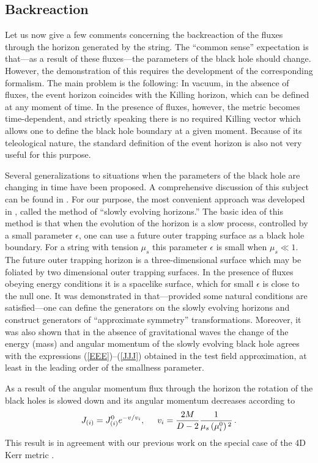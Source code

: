 \documentclass[superscriptaddress,twocolumn,showpacs,
preprintnumbers,amsmath,amssymb,nofootinbib,
longbibliography,aps,prd,10pt]{revtex4-1}
\newcommand{\hh}{,\hspace{0.5cm}}
\newcommand{\be}{\begin{equation}}             %
\newcommand{\ee}{\end{equation}}               %
\begin{document}
\subsection{Backreaction}
Let us now give a few comments concerning the backreaction of the fluxes through the horizon generated by the string. The ``common sense'' expectation is that---as a result of these fluxes---the parameters of the black hole should change. However, the demonstration of this requires the development of the corresponding formalism. The main problem is the following: In vacuum, in the absence of fluxes, the event horizon coincides with the Killing horizon, which can be defined at any moment of time. In the presence of fluxes, however, the metric becomes time-dependent, and strictly speaking there is no required Killing vector which allows one to define the black hole boundary at a given moment. Because of its teleological nature, the standard definition of the event horizon is also not very useful for this purpose.

Several generalizations to situations when the parameters of the black hole are changing in time have been proposed. A comprehensive discussion of this subject can be found in \cite{Ashtekar:2004cn}. For our purpose, the most convenient approach was developed in \cite{Booth:2003ji,Booth:2006bn}, called the method of ``slowly evolving horizons.'' The basic idea of this method is that when the evolution of the horizon is a slow process, controlled by a small parameter $\epsilon$, one can use a future outer trapping surface as a black hole boundary. For a string with tension $\mu_s$ this parameter $\epsilon$ is small when $\mu_s\ll 1$. The future outer trapping horizon is a three-dimensional surface which may be foliated by two dimensional outer trapping surfaces. In the presence of fluxes obeying energy conditions it is a spacelike surface, which for small $\epsilon$ is close to the null one. It was demonstrated in \cite{Booth:2003ji,Booth:2006bn} that---provided some natural conditions are satisfied---one can define the generators on the slowly evolving horizons and construct generators of ``approximate symmetry'' transformations. Moreover, it was also shown that in the absence of gravitational waves the change of the energy (mass) and angular momentum of the slowly evolving black hole agrees with the expressions (\ref{EEE})--(\ref{JJJ}) obtained in the test field approximation, at least in the leading order of the smallness parameter.

As a result of the angular momentum flux through the horizon the rotation of the black holes is slowed down and its angular momentum decreases according to
\be
{J}_{(i)}={J}_{(i)}^0 e^{-v/v_i}\hh v_i=\frac{2M}{D-2} \frac{1}{ \mu_s \left( \mu_i^0 \right){}^2} \, .
\ee
This result is in agreement with our previous work on the special case of the 4D Kerr metric \cite{Boos:2017pyd}.
\end{document}

